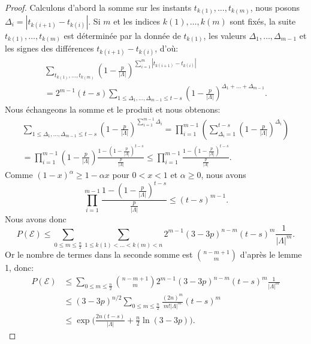 \documentclass[titlepage,a4paper,12pt]{article}
\newcounter{d}
\newcounter{t}
\newcounter{p}
\newcounter{c}
\newcounter{a}
\newcounter{l}
\begin{document}
\begin{proof}
Calculons d'abord la somme sur les instants $t_{k(1)},\dots,t_{k(m)}$, nous posons $\Delta_i = |t_{k(i+1)}-t_{k(i)}|$. Si $m$ et les indices $k(1),\dots,k(m)$ sont fixés, la suite $t_{k(1)},\dots,t_{k(m)}$ est déterminée par la donnée de $t_{k(1)}$, les valeurs $\Delta_1,\dots,\Delta_{m-1}$ et les signes des différences $t_{k(i+1)}-t_{k(i)}$, d'où:
\begin{multline*}\sum_{t_{k(1)},\dots,t_{k(m)}}(1-\frac{p}{|\Lambda|})^{\displaystyle\sum_{i=1}^{m}|t_{k(i+1)}-t_{k(i)}|} \\ = 2^{m-1}(t-s)\sum_{1\leqslant\Delta_1,\dots,\Delta_{m-1}\leqslant t-s}(1-\frac{p}{|\Lambda|})^{\Delta_1+\dots+\Delta_{m-1}}.
\end{multline*}
Nous échangeons la somme et le produit et nous obtenons:
\begin{multline*}\sum_{1\leqslant\Delta_1,\dots,\Delta_{m-1}\leqslant t-s}(1-\frac{p}{|\Lambda|})^{\sum_{i=1}^{m-1}\Delta_i} = \prod_{i=1}^{m-1}\left(\sum_{\Delta_i = 1}^{t-s}\left(1-\frac{p}{|\Lambda|}\right)^{\Delta_i}\right)\\= \prod_{i=1}^{m-1}\left(1-\frac{p}{|\Lambda|}\right)\frac{\displaystyle1-(1-\frac{p}{|\Lambda|})^{t-s}}{\displaystyle\frac{p}{|\Lambda|}}\leqslant \prod_{i=1}^{m-1}\frac{\displaystyle1-(1-\frac{p}{|\Lambda|})^{t-s}}{\displaystyle\frac{p}{|\Lambda|}}.
\end{multline*}
Comme $(1-x)^\alpha \geqslant 1-\alpha x$ pour $0<x<1$ et $\alpha\geqslant 0$, nous avons 
$$ \prod_{i=1}^{m-1}\frac{\displaystyle 1-(1-\frac{p}{|\Lambda|})^{t-s}}{\displaystyle\frac{p}{|\Lambda|}} \leqslant(t-s)^{m-1}.
$$
Nous avons donc
$$P(\mathcal{E}) \leqslant\sum_{0\leqslant m \leqslant \frac{n}{2}}\sum_{1\leqslant k(1)<\dots<k(m)<n} 2^{m-1}(3-3p)^{n-m}(t-s)^m\frac{1}{|\Lambda|^m}.
$$
Or le nombre de termes dans la seconde somme est $\binom{n-m+1}{m}$ d'après le lemme 1, donc:
\begin{align*}P\left(\mathcal{E}\right)& \leqslant\sum_{0\leqslant m \leqslant\frac{n}{2}}\binom{n-m+1}{m} 2^{m-1}(3-3p)^{n-m}(t-s)^m\frac{1}{|\Lambda|^m}\\
& \leqslant (3-3p)^{n/2}\sum_{0\leqslant m \leqslant\frac{n}{2}}\frac{(2n)^m}{m!|\Lambda|^m}(t-s)^m \\
&\leqslant \exp\big(\frac{2n(t-s)}{|\Lambda|}+\frac{n}{2}\ln(3-3p)\big).
\end{align*}
\end{proof}
\end{document}

